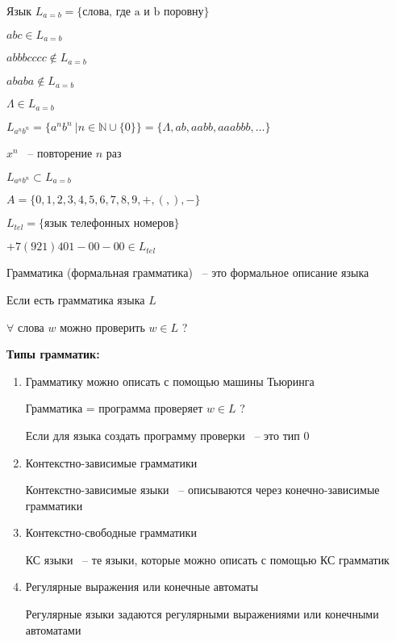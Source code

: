 \documentclass[russian]{lecture-notes}
\begin{document}
\begin{example}
	Язык $L_{a = b} = \{ \textrm{слова, где a и b поровну}\}$
	
	$abc \in L_{a = b}$
	
	$abbbcccc \notin L_{a = b}$
	
	$ababa \notin L_{a = b}$

	$\Lambda \in L_{a = b}$
\end{example}

\begin{example}
	
	$L_{a^n b^n} = \{ a^n b^n \: | n \in \mathbb{N} \cup \{0 \} \} = \{ \Lambda, ab, aabb, aaabbb, \dots \}$
	
	$x^n$ ~-- повторение $n$ раз
	
	$L_{a^n b^n} \subset L_{a = b}$
\end{example}

\begin{example}
	$A = \{ 0, 1, 2, 3, 4, 5, 6, 7, 8, 9, +, (, ), - \}$
	
	$L_{tel} = \{ \textrm{язык телефонных номеров} \}$
	
	$+7 (921) 401-00-00 \in L_{tel}$
\end{example}

\begin{definition}
	Грамматика (формальная грамматика) ~-- это формальное описание языка
	
	Если есть грамматика языка $L$
	
	$\forall$ слова $w$ можно проверить $w \in L$ ?
\end{definition}

	\textbf{Типы грамматик:}

	\begin{enumerate} \addtocounter{enumi}{-1}
		\item{
			Грамматику можно описать с помощью машины Тьюринга 
	
			Грамматика = программа проверяет $w \in L$ ?
	
			Если для языка создать программу проверки ~-- это тип 0		
		}
		\item{
			Контекстно-зависимые грамматики
			
			Контекстно-зависимые языки ~-- описываются через конечно-зависимые грамматики		
		}
		\item{
			Контекстно-свободные грамматики
			
			КС языки ~-- те языки, которые можно описать с помощью КС грамматик		
		}
		\item{
			Регулярные выражения или конечные автоматы
			
			Регулярные языки задаются регулярными выражениями или конечными автоматами		
		}
	\end{enumerate}
	
\end{document}
